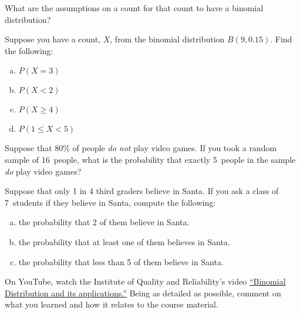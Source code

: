 \documentclass[11pt,letterpaper]{article}
\begin{document}

 What are the assumptions on a count for that count to have a binomial distribution? 



\newpage



 Suppose you have a count, $X$, from the binomial distribution $B(9, 0.15)$. Find the following:
	\begin{enumerate}[(a)]
	\item $P(X= 3)$
	\item $P(X < 2)$
	\item $P(X \geq 4)$
	\item $P(1 \leq X < 5)$
	\end{enumerate}



\newpage



 Suppose that 80\% of people \textit{do not} play video games. If you took a random sample of 16~people, what is the probability that exactly 5~people in the sample \textit{do} play video games?



\newpage



 Suppose that only 1 in 4 third graders believe in Santa. If you ask a class of 7~students if they believe in Santa, compute the following:
	\begin{enumerate}[(a)]
	\item the probability that 2 of them believe in Santa. 
	\item the probability that at least one of them believes in Santa. 
	\item the probability that less than 5 of them believe in Santa. 
	\end{enumerate}



\newpage



 On YouTube, watch the Institute of Quality and Reliability's video \href{https://www.youtube.com/watch?v=4XYnfABrhVk&pp=ygUqQmlub21pYWwgRGlzdHJpYnV0aW9uIGFuZCBpdHMgYXBwbGljYXRpb25z}{``Binomial Distribution and its applications.''} Being as detailed as possible, comment on what you learned and how it relates to the course material. 
\end{document}
